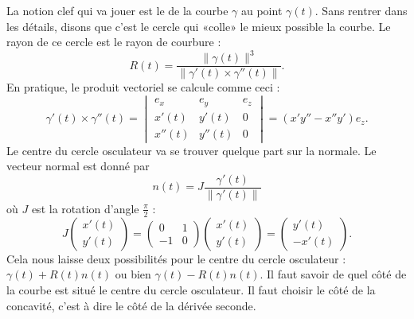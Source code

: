 La notion clef qui va jouer est le  de la courbe $\gamma$ au point $\gamma(t)$. Sans rentrer dans les détails, disons que c'est le cercle qui «colle» le mieux possible la courbe. Le rayon de ce cercle est le rayon de courbure :
\begin{equation}
    R(t)=\frac{ \| \gamma(t) \|^3 }{ \| \gamma'(t)\times\gamma''(t) \| }.
\end{equation}
En pratique, le produit vectoriel se calcule comme ceci :
\begin{equation}
    \gamma'(t)\times\gamma''(t)=\begin{vmatrix}
        e_x &   e_y &   e_z \\
        x'(t)   &   y'(t)   &   0   \\
        x''(t)  &   y''(t)  &   0
    \end{vmatrix}=(x'y''-x''y')e_z.
\end{equation}
Le centre du cercle osculateur va se trouver quelque part sur la normale. Le vecteur normal est donné par
\begin{equation}
    n(t)=J\frac{\gamma'(t) }{ \| \gamma'(t) \| }
\end{equation}
où $J$ est la rotation d'angle $\frac{ \pi }{2}$ :
\begin{equation}
    J\begin{pmatrix}
        x'(t)   \\ 
        y'(t)   
    \end{pmatrix}=
    \begin{pmatrix}
        0   &   1   \\ 
        -1  &   0   
    \end{pmatrix}\begin{pmatrix}
        x'(t)   \\ 
        y'(t)   
    \end{pmatrix}=\begin{pmatrix}
        y'(t)   \\ 
        -x'(t)  
    \end{pmatrix}.
\end{equation}
Cela nous laisse deux possibilités pour le centre du cercle osculateur : $\gamma(t)+R(t)n(t)$ ou bien $\gamma(t)-R(t)n(t)$. Il faut savoir de quel côté de la courbe est situé le centre du cercle osculateur. Il faut choisir le côté de la concavité, c'est à dire le côté de la dérivée seconde.

\newcommand{\CaptionFigQuelCote}{De quel coté de $\gamma'(t)$ se trouvent $n(t)$ et $-n(t)$ ?}



